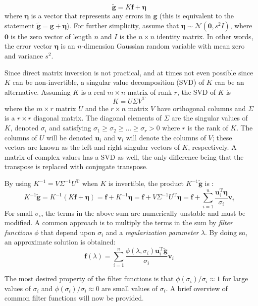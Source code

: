 \documentclass[12pt]{article}
\newcommand{\gdis}{\mathbf{g}}
\newcommand{\gnoise}{\widetilde{\mathbf{g}}}
\newcommand{\kmat}{K}	%
\newcommand{\fdis}{\mathbf{f}}
\newcommand{\trans}{\mathrm{T}}	%
\newcommand{\regparam}{\lambda}
\newcommand{\filt}{\phi}
\newcommand{\SD}{s}	%
\newcommand{\noise}{\bm{\eta}}	%
\newcommand{\singular}{\sigma}	%
\newcommand{\LSV}{\mathbf{u}}	%
\newcommand{\RSV}{\mathbf{v}}	%
\begin{document}
\begin{equation}
\gnoise = \kmat\fdis + \noise
\end{equation}
where $\noise$ is a vector that represents any errors in $\gdis$ (this is equivalent to the statement $\gnoise = \gdis + \noise$). For further simplicity, assume that $\noise \sim \mathcal{N}(\bm{0},\SD^2I)$, where $\bm{0}$ is the zero vector of length $n$ and $I$ is the $n \times n$ identity matrix. In other words, the error vector $\noise$ is an $n$-dimension Gaussian random variable with mean zero and variance $\SD^2$. \par
Since direct matrix inversion is not practical, and at times not even possible since $\kmat$ can be non-invertible, a singular value decomposition (SVD) of $\kmat$ can be an alternative. Assuming $\kmat$ is a real $m \times n$ matrix of rank $r$, the SVD of $\kmat$ is
\[\kmat = U\Sigma{V^\trans}\]
where the $m \times r$ matrix $U$ and the $r \times n$ matrix $V$ have orthogonal columns and $\Sigma$ is a $r \times r$ diagonal matrix. The diagonal elements of $\Sigma$ are the singular values of $\kmat$, denoted $\singular_i$ and satisfying $\singular_1 \geq \singular_2 \geq \ldots \geq \singular_r > 0$ where $r$ is the rank of $\kmat$. The columns of $U$ will be denoted $\LSV_i$ and $\RSV_i$ will denote the columns of $V$; these vectors are known as the left and right singular vectors of $\kmat$, respectively. A matrix of complex values has a SVD as well, the only difference being that the transpose is replaced with conjugate transpose. \par
By using $\kmat^{-1} = V\Sigma^{-1}U^\trans$ when $\kmat$ is invertible, the product $\kmat^{-1}\gnoise$ is :
\[\kmat^{-1}\gnoise = \kmat^{-1}\left(\kmat\fdis + \noise\right) = \fdis + \kmat^{-1}\noise = \fdis + V\Sigma^{-1}{U^\trans}\noise = \fdis + \sum_{i = 1}^n \frac{{\LSV^\trans_i}\noise}{\singular_i}\RSV_i\]
For small $\singular_i$, the terms in the above sum are numerically unstable and must be modified. A common approach is to multiply the terms in the sum by \textit{filter functions} $\filt$ that depend upon $\singular_i$ and a \textit{regularization parameter} $\regparam$. By doing so, an approximate solution is obtained:
\begin{equation}
\fdis(\regparam) = \sum_{i = 1}^n \frac{\filt(\regparam,\singular_i){\LSV^\trans_i}\gnoise}{\singular_i}\RSV_i
\end{equation}

The most desired property of the filter functions is that $\filt(\singular_i)/\singular_i \approx 1$  for large values of $\singular_i$ and $\filt(\singular_i)/\singular_i \approx 0$ are small values of $\singular_i$. A brief overview of common filter functions will now be provided.
\end{document}
